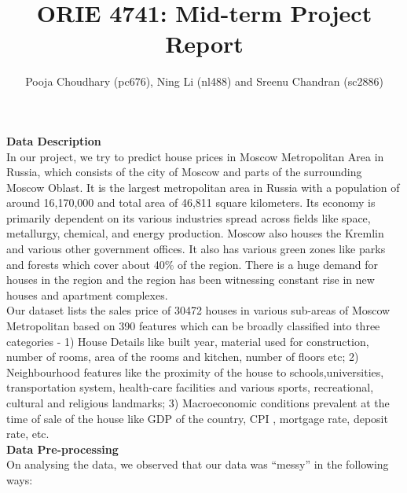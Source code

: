 \documentclass[11pt]{article}
\begin{document}
\title{\textbf{ORIE 4741: Mid-term Project Report}}
\author{Pooja Choudhary (pc676), Ning Li (nl488) and Sreenu Chandran (sc2886)}
\date{}

\maketitle

\begin{flushleft}
\textbf{Data Description}\\[2pt]
In our project, we try to predict house prices in Moscow Metropolitan Area in Russia, which consists of the city of Moscow and parts of the surrounding Moscow Oblast. It is the largest metropolitan area in Russia with a population of around 16,170,000 and total area of 46,811 square kilometers. Its economy is primarily dependent on its various industries spread across fields like space, metallurgy, chemical, and energy production. Moscow also houses the Kremlin and various other government offices. It also has various green zones like parks and forests which cover about 40$\%$ of the region.
There is a huge demand for houses in the region and the region has been witnessing constant rise in new houses and apartment complexes.\\[5pt]
Our dataset lists the sales price of 30472 houses in various sub-areas of Moscow Metropolitan based on 390 features which can be broadly classified into three categories - 1) House Details like built year, material used for construction, number of rooms, area of the rooms and kitchen, number of floors etc; 2) Neighbourhood features like the proximity of the house to schools,universities, transportation system, health-care facilities and various sports, recreational, cultural and religious landmarks; 3) Macroeconomic conditions prevalent at the time of sale of the house like GDP of the country, CPI , mortgage rate, deposit rate, etc.\\[5pt]

\textbf{Data Pre-processing}\\[2pt]
On analysing the data, we observed that our data was “messy” in the following ways:\\[2pt]


\end{flushleft}
\end{document}
